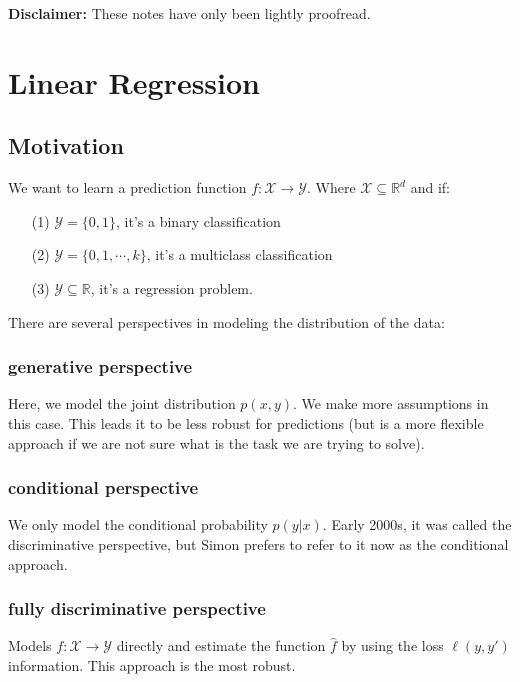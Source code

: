 \documentclass[12pt]{report}
\def\R{\mathbb{R}}
\renewcommand{\emph}[1]{\color{violet}#1\color{black}{}}
\begin{document}
 
 

\maketitle

\textbf{Disclaimer:} These notes have only been lightly proofread.

\section{Linear Regression}

\subsection{Motivation}

We want to learn a prediction function $f: \mathcal{X} \to \mathcal{Y}$. Where
$\mathcal{X} \subseteq \R^d$ and if:
\begin{enumerate}
    \item[(1)] $\mathcal{Y} = \{0,1\}$, it's a \emph{binary} classification
    \item[(2)] $\mathcal{Y} = \{0,1, \cdots, k\}$, it's a \emph{multiclass} classification
    \item[(3)] $\mathcal{Y} \subseteq \R$, it's a regression problem.
\end{enumerate}

There are several perspectives in modeling the distribution of the data:

    \subsubsection{generative perspective}
    Here, we model the joint distribution $p(x,y)$. We make more assumptions in this
    case. This leads it to be less robust for predictions (but is a more flexible approach if we are not sure what is the task we are trying to solve).
    \subsubsection{conditional perspective}
    We only model the conditional probability $p(y|x)$. Early 2000s, it was called 
    the \emph{discriminative} perspective, but Simon prefers to refer to it now as the \emph{conditional approach}.
    \subsubsection{fully discriminative perspective}
    Models $f: \mathcal{X} \to \mathcal{Y}$ directly and estimate the function $\hat{f}$ by using the loss $\ell(y,y')$ information. This approach is the most robust.
\end{document}

